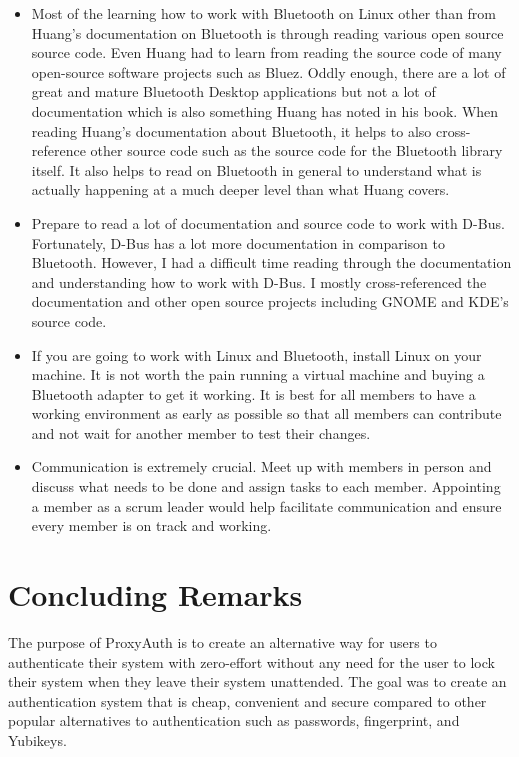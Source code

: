 \documentclass[letterpaper,twocolumn,10pt]{article}
\begin{document}
{{\begin{singlespacing}
\begin{itemize}
\item Most of the learning how to work with Bluetooth on Linux other than from Huang's documentation on Bluetooth is through reading various open source source code. Even Huang had to learn from reading the source code of many open-source software projects such as Bluez. Oddly enough, there are a lot of great and mature Bluetooth Desktop applications but not a lot of documentation which is also something Huang has noted in his book. When reading Huang's documentation about Bluetooth, it helps to also cross-reference other source code such as the source code for the Bluetooth library itself. It also helps to read on Bluetooth in general to understand what is actually happening at a much deeper level than what Huang covers.

\item Prepare to read a lot of documentation and source code to work with D-Bus. Fortunately, D-Bus has a lot more documentation in comparison to Bluetooth. However, I had a difficult time reading through the documentation and understanding how to work with D-Bus. I mostly cross-referenced the documentation and other open source projects including GNOME and KDE's source code.

\item If you are going to work with Linux and Bluetooth, install Linux on your machine. It is not worth the pain running a virtual machine and buying a Bluetooth adapter to get it working. It is best for all members to have a working environment as early as possible so that all members can contribute and not wait for another member to test their changes.

\item Communication is extremely crucial. Meet up with members in person and discuss what needs to be done and assign tasks to each member. Appointing a member as a scrum leader would help facilitate communication and ensure every member is on track and working.
\end{itemize}
\end{singlespacing}
\label{Section 6.3}

\section{Concluding Remarks}

The purpose of ProxyAuth is to create an alternative way for users to authenticate their system with zero-effort without any need for the user to lock their system when they leave their system unattended. The goal was to create an authentication system that is cheap, convenient and secure compared to other popular alternatives to authentication such as passwords, fingerprint, and Yubikeys.

}}
\end{document}
